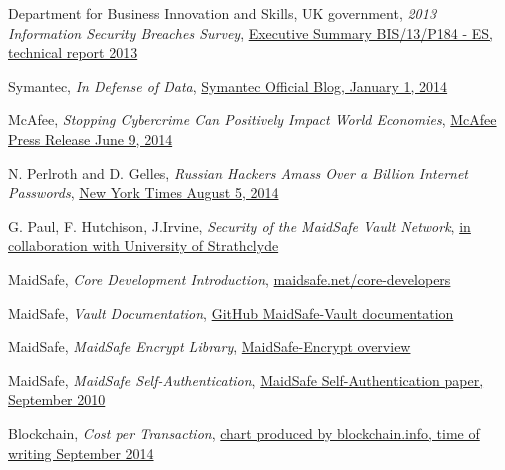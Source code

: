 \documentclass[twocolumn,english]{article}
\begin{document}
\begin{thebibliography}{9}
 Department for Business Innovation and Skills, UK government, \emph{2013 Information Security Breaches Survey}, \href{https://www.gov.uk/government/uploads/system/uploads/attachment_data/file/191671/bis-13-p184es-2013-information-security-breaches-survey-executive-summary.pdf}{Executive Summary BIS/13/P184 - ES, technical report 2013}

 Symantec, \emph{In Defense of Data}, \href{http://www.symantec.com/connect/blogs/data-breach-trends}{Symantec Official Blog, January 1, 2014}

 McAfee, \emph{Stopping Cybercrime Can Positively Impact World Economies}, \href{http://www.mcafee.com/uk/about/news/2014/q2/20140609-01.aspx}{McAfee Press Release June 9, 2014}

 N. Perlroth and D. Gelles, \emph{Russian Hackers Amass Over a Billion Internet Passwords}, \href{http://www.nytimes.com/2014/08/06/technology/russian-gang-said-to-amass-more-than-a-billion-stolen-internet-credentials.html}{New York Times August 5, 2014}

 G. Paul, F. Hutchison, J.Irvine, \emph{Security of the MaidSafe Vault Network}, \href{https://pure.strath.ac.uk/portal/files/34898763/Paul_etal_wwrf32_vault_network.pdf}{in collaboration with University of Strathclyde}

 MaidSafe, \emph{Core Development Introduction}, \href{http://maidsafe.net/core-developers}{maidsafe.net/core-developers}

 MaidSafe, \emph{Vault Documentation}, \href{https://github.com/maidsafe/MaidSafe-Vault/wiki/Documentation}{GitHub MaidSafe-Vault documentation}

 MaidSafe, \emph{MaidSafe Encrypt Library}, \href{http://maidsafe.net/libraries-encrypt}{MaidSafe-Encrypt overview}

 MaidSafe, \emph{MaidSafe Self-Authentication}, \href{http://maidsafe.net/Whitepapers/pdf/SelfAuthentication.pdf}{MaidSafe Self-Authentication paper, September 2010}

 Blockchain, \emph{Cost per Transaction}, \href{https://blockchain.info/charts/cost-per-transaction}{chart produced by blockchain.info, time of writing September 2014}

\end{thebibliography}
\end{document}

